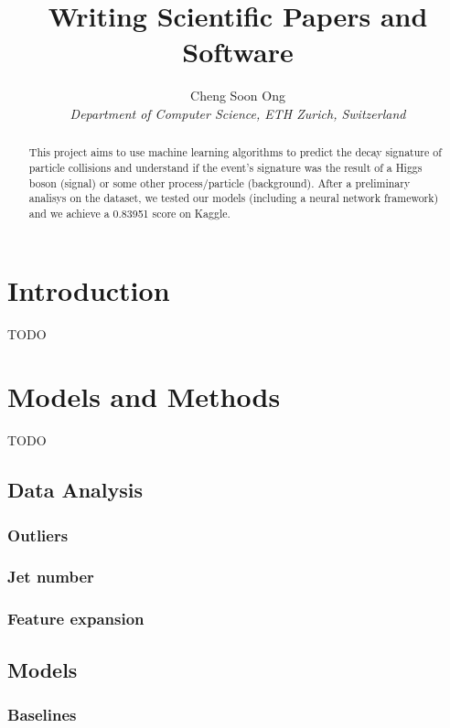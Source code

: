 \documentclass[10pt,conference,compsocconf]{IEEEtran}
\begin{document}
\title{Writing Scientific Papers and Software}

\author{
  Cheng Soon Ong\\
  \textit{Department of Computer Science, ETH Zurich, Switzerland}
}

\maketitle

\begin{abstract}
  This project aims to use machine learning algorithms to predict the decay signature of particle collisions and understand if the event’s signature was the result of a Higgs boson (signal) or some other process/particle (background). After a preliminary analisys on the dataset, we tested our models (including a neural network framework) and we achieve a 0.83951 score on Kaggle.
\end{abstract}

\section{Introduction}
TODO
\section{Models and Methods}
TODO
\subsection{Data Analysis}
\subsubsection{Outliers}
\subsubsection{Jet number}
\subsubsection{Feature expansion}

\subsection{Models}
\subsubsection{Baselines}
\end{document}
